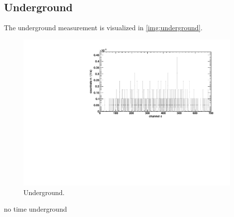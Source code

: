 \subsection{Underground}
The underground measurement is visualized in \autoref{img:underground}.
\begin{figure}[H]
\begin{center}
  \includegraphics[width=\textwidth]{../img/underground.pdf}
  \caption{Underground.}
  \label{img:underground}
\end{center}
\end{figure}

no time underground

